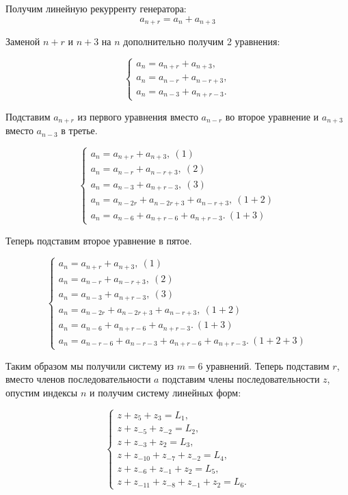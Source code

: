 \documentclass[letterpaper,11pt,openany]{book}
\begin{document}
Получим линейную рекурренту генератора:
$$a_{n+r} = a_n + a_{n+3}$$

Заменой $n+r$ и $n+3$ на $n$ дополнительно получим 2 уравнения:

\begin{equation*}
\begin{cases}
a_n = a_{n+r} + a_{n+3}, \\
a_n = a_{n-r} + a_{n-r+3}, \\
a_n = a_{n-3} + a_{n+r-3}.
\end{cases}
\end{equation*}

Подставим $a_{n+r}$ из первого уравнения вместо $a_{n-r}$ во второе уравнение и $a_{n+3}$ вместо $a_{n-3}$ в третье.

\begin{equation*}
\begin{cases}
a_n = a_{n+r} + a_{n+3},\ (1) \\
a_n = a_{n-r} + a_{n-r+3},\ (2) \\
a_n = a_{n-3} + a_{n+r-3},\ (3) \\
a_n = a_{n-2r} + a_{n-2r+3} + a_{n-r+3},\ (1+2) \\
a_n = a_{n-6} + a_{n+r-6} + a_{n+r-3}.\ (1+3)
\end{cases}
\end{equation*}

Теперь подставим второе уравнение в пятое.

\begin{equation*}
\begin{cases}
a_n = a_{n+r} + a_{n+3},\ (1) \\
a_n = a_{n-r} + a_{n-r+3},\ (2) \\
a_n = a_{n-3} + a_{n+r-3},\ (3) \\
a_n = a_{n-2r} + a_{n-2r+3} + a_{n-r+3},\ (1+2) \\
a_n = a_{n-6} + a_{n+r-6} + a_{n+r-3}.\ (1+3) \\
a_n = a_{n-r-6} + a_{n-r-3} + a_{n+r-6} + a_{n+r-3}.\ (1+2+3)
\end{cases}
\end{equation*}

Таким образом мы получили систему из $m=6$ уравнений. Теперь подставим $r$, вместо членов последовательности $a$ подставим члены последовательности $z$, опустим индексы $n$ и получим систему линейных форм:

\begin{equation*}
\begin{cases}
z + z_{5} + z_{3} = L_1, \\
z + z_{-5} + z_{-2} = L_2, \\
z + z_{-3} + z_{2} = L_3, \\
z + z_{-10} + z_{-7} + z_{-2} = L_4, \\
z + z_{-6} + z_{-1} + z_{2} = L_5, \\
z + z_{-11} + z_{-8} + z_{-1} + z_{2} = L_6.
\end{cases}
\end{equation*}
\end{document}
